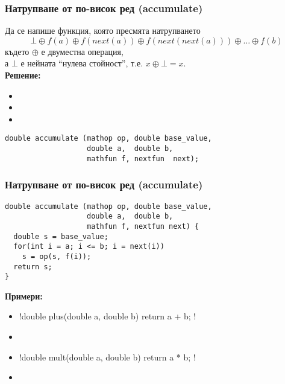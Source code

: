 \documentclass{beamer}
\begin{document}
\begin{frame}[fragile]
  \frametitle{Натрупване от по-висок ред (accumulate)}
    Да се напише функция, която пресмята натрупването
  \begin{equation*}
    \bot \oplus f(a) \oplus f(next(a)) \oplus f(next(next(a))) \oplus \ldots \oplus f(b)
  \end{equation*}
  където $\oplus$ е двуместна операция,\\
  а $\bot$ е нейната ``нулева стойност'', т.е. $x\oplus\bot = x$.\\[1em]
  \pause
  \textbf{Решение:}
  \begin{itemize}
  \item {}
  \item {}
  \item {}
  \end{itemize}
  \pause

\begin{lstlisting}
double accumulate (mathop op, double base_value,
                   double a,  double b,
                   mathfun f, nextfun  next);
\end{lstlisting}
\end{frame}

\begin{frame}[fragile]
  \frametitle{Натрупване от по-висок ред (accumulate)}
\begin{lstlisting}
double accumulate (mathop op, double base_value,
                   double a,  double b,
                   mathfun f, nextfun next) {
  double s = base_value;
  for(int i = a; i <= b; i = next(i))
    s = op(s, f(i));
  return s;
}
\end{lstlisting}
  \pause
  \textbf{Примери:}
  \small
  \begin{itemize}[<+->]
  \item \lst!double plus(double a, double b) { return a + b; }!
  \item {} \eqv {}
  \item \lst!double mult(double a, double b) { return a * b; }!
  \item {} \eqv {}
  \end{itemize}
\end{frame}
\end{document}
